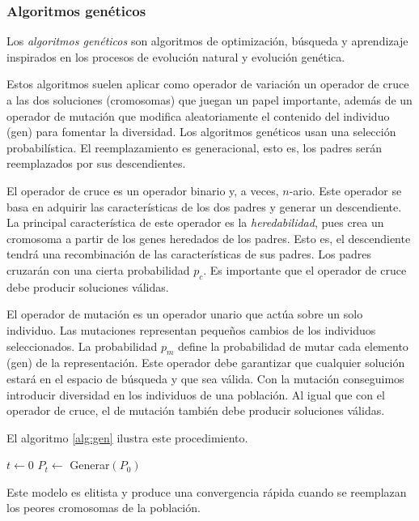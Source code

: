 \subsubsection{Algoritmos genéticos}

Los \emph{algoritmos genéticos} son algoritmos de optimización, búsqueda y aprendizaje inspirados en los procesos de evolución natural y evolución genética.

Estos algoritmos suelen aplicar como operador de variación un operador de cruce a las dos soluciones (cromosomas) que juegan un papel importante, además de un operador de mutación que modifica aleatoriamente el contenido del individuo (gen) para fomentar la diversidad. Los algoritmos genéticos usan una selección probabilística. El reemplazamiento es generacional, esto es, los padres serán reemplazados por sus descendientes.

El operador de cruce es un operador binario y, a veces, $n$-ario. Este operador se basa en adquirir las características de los dos padres y generar un descendiente. La principal característica de este operador es la \emph{heredabilidad}, pues crea un cromosoma a partir de los genes heredados de los padres. Esto es, el descendiente tendrá una recombinación de las características de sus padres. Los padres cruzarán con una cierta probabilidad $p_c$. Es importante que el operador de cruce debe producir soluciones válidas.

El operador de mutación es un operador unario que actúa sobre un solo individuo. Las mutaciones representan pequeños cambios de los individuos seleccionados. La probabilidad $p_m$ define la probabilidad de mutar cada elemento (gen) de la representación. Este operador debe garantizar que cualquier solución estará en el espacio de búsqueda y que sea válida. Con la mutación conseguimos introducir diversidad en los individuos de una población. Al igual que con el operador de cruce, el de mutación también debe producir soluciones válidas.

El algoritmo \ref{alg:gen} ilustra este procedimiento.

\begin{Ualgorithm}[H]
    \label{alg:gen}
    \small
    \DontPrintSemicolon
    $t \longleftarrow 0$\;
    $P_t \longleftarrow$ Generar$(P_0)$ 

\end{Ualgorithm}

Este modelo es elitista y produce una convergencia rápida cuando se reemplazan los peores cromosomas de la población.


